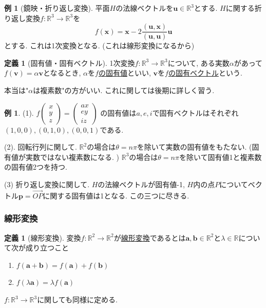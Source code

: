 \documentclass[dvipdfmx,a4paper,11pt]{article} %
\newcommand{\R}{\mathbb{R}}
\theoremstyle{definition}
\newtheorem{dfn}[thm]{定義}
\newtheorem{exa}[thm]{例}
\begin{document}
 \begin{exa}[鏡映・折り返し変換]
平面$H$の法線ベクトルを$\bm{u} \in \R^3$とする. 
$H$に関する折り返し変換$f : \R^3 \to \R^3$を
$$
f(\bm{x})
=
\bm{x} - 2 \frac{(\bm{u}, \bm{x})}{(\bm{u}, \bm{u})} \bm{u}
$$
 とする. これは1次変換となる. (これは線形変換になるから)
\end{exa}

\begin{dfn}[固有値・固有ベクトル]
1次変換$f : \R^3 \to \R^3$について, ある実数$\alpha$があって
$f(\bm{v})=\alpha \bm{v}$となるとき, 
$\alpha$を\underline{$f$の固有値}といい, $\bm{v}$を\underline{$f$の固有ベクトル}という. 
\end{dfn}
本当は"$\alpha$は複素数"の方がいい. これに関しては後期に詳しく習う. 

\begin{exa}
(1). 
$f
\begin{pmatrix}
x\\
y\\
z
\end{pmatrix}
=
\begin{pmatrix}
ax\\
ey\\
iz
\end{pmatrix}
$
の固有値は$a, e,i$で固有ベクトルはそれぞれ$(1,0,0), (0,1,0), (0,0,1)$である. 

(2). 回転行列に関して. $\R^2$の場合は$\theta=n\pi$を除いて実数の固有値をもたない. (固有値が実数ではない複素数になる. ) $\R^3$の場合は$\theta=n\pi$を除いて固有値1と複素数の固有値2つを持つ. 

(3) 折り返し変換に関して.
$H$の法線ベクトルが固有値-1, $H$内の点$P$についてベクトル$\bm{p}=\overset{\to}{OP}$に関する固有値は1となる.
この三つに尽きる. 
\end{exa}

 \subsubsection{線形変換}

 \begin{dfn}[線形変換]
変換$f : \R^2 \to \R^2$が\underline{線形変換}であるとは$\bm{a}, \bm{b} \in \R^2$と$\lambda \in \R$について次が成り立つこと
\begin{enumerate}
\item $f(\bm{a} + \bm{b}) = f(\bm{a}) + f(\bm{b})$
\item $f(\lambda \bm{a} ) =\lambda f(\bm{a}) $
\end{enumerate}
$f : \R^3 \to \R^3$に関しても同様に定める. 
\end{dfn}
\end{document}
